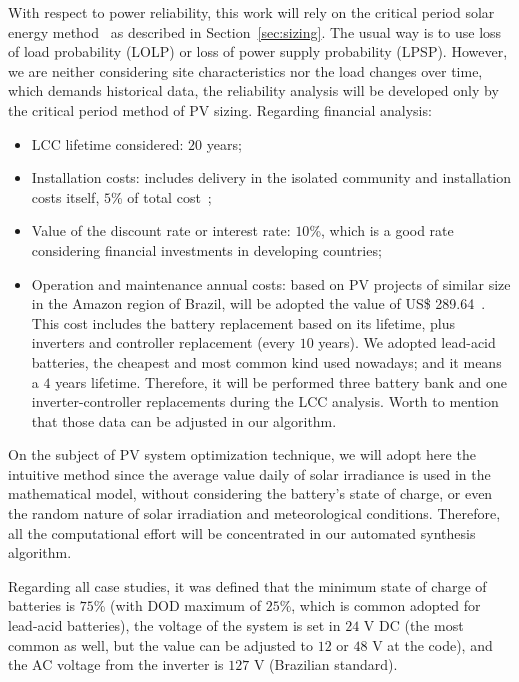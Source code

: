 \documentclass[journal]{IEEEtran}
\begin{document}
With respect to power reliability, this work will rely on the critical period solar 
energy method~\cite{Pinho} as described in Section~\ref{sec:sizing}. 
The usual way is to use loss of load probability (LOLP) or loss of power 
supply probability (LPSP). However, we are neither considering site characteristics nor the load changes over time, 
which demands historical data, the reliability analysis will be developed only 
by the critical period method of PV sizing.
%
Regarding financial analysis:
\begin{itemize}
	\item LCC lifetime considered: $20$ years;
	\item Installation costs: includes delivery in the isolated community and installation costs itself, $5$\% of total cost~\cite{Agrener2013};
	\item Value of the discount rate or interest rate: $10$\%, which is a good rate considering financial investments in developing countries;
	\item Operation and maintenance annual costs: based on PV projects of similar size in the Amazon region of Brazil, will be adopted the value of US\$ 289.64~\cite{Agrener2013}. This cost includes the battery replacement based on its lifetime, plus inverters and controller replacement (every $10$ years). We adopted lead-acid batteries, the cheapest and most common kind used nowadays; and it means a $4$ years lifetime. Therefore, it will be performed three battery bank and one inverter-controller replacements during the LCC analysis. Worth to mention that  those data can be adjusted in our algorithm.
\end{itemize}

On the subject of PV system optimization technique, we will adopt here the intuitive method 
since the average value daily of solar irradiance is used in the mathematical model, 
without considering the battery's state of charge, or even the random nature 
of solar irradiation and meteorological conditions. Therefore, all the computational 
effort will be concentrated in our automated synthesis algorithm.

Regarding all case studies, it was defined that the minimum state of charge of batteries is $75$\% (with DOD maximum of $25$\%, which is common adopted for lead-acid batteries), the voltage of the system is set in $24$ V DC (the most common as well, but the value can be adjusted to $12$ or $48$ V at the code), and the AC voltage from the inverter is $127$ V (Brazilian standard).
\end{document}
